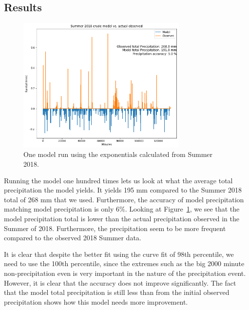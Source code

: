 \documentclass[11pt]{report}
\begin{document}
\clearpage 

\subsection{Results}\label{sec:sfp_r}

\begin{figure}[t]
  \centering
  \includegraphics[width=0.75\textwidth]{Figures/better_one_run.png}
  \caption[One run using Summer 2018 climatology] {\label{crudemodel}One
    model run using the exponentials calculated from Summer 2018.}
\end{figure}

Running the model one hundred times lets us look at what the average total
precipitation the model yields. It yields 195 mm compared to the Summer 2018
total of 268 mm that we used. Furthermore, the accuracy of model
precipitation matching model precipitation is only 6$\%$. Looking at
Figure~\ref{crudemodel}, we see that the model precipitation total is lower
than the actual precipitation observed in the Summer of 2018. Furthermore,
the precipitation seem to be more frequent compared to the observed 2018
Summer data.

It is clear that despite the better fit using the curve fit of 98th
percentile, we need to use the 100th percentile, since the extremes such as
the big 2000 minute non-precipitation even is very important in the nature
of the precipitation event. However, it is clear that the accuracy does not
improve significantly. The fact that the model total precipitation is still
less than from the initial observed precipitation shows how this model needs
more improvement.
\clearpage
\end{document}
